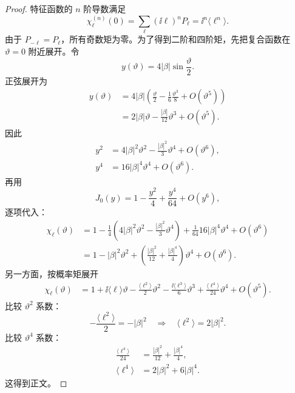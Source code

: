 \begin{proof}
特征函数的 $n$ 阶导数满足
\begin{equation*}
 \chi_\ell^{(n)}(0)
 =\sum_\ell(\ii\ell)^nP_\ell
 =\ii^n\langle\ell^n\rangle.
\end{equation*}
由于 $P_{-\ell}=P_\ell$，所有奇数矩为零。为了得到二阶和四阶矩，先把复合函数在 $\vartheta=0$ 附近展开。令
\begin{equation*}
 y(\vartheta)
 =4|\beta|\sin\frac{\vartheta}{2}.
\end{equation*}
正弦展开为
\begin{align*}
 y(\vartheta)
 &=4|\beta|
 \left(\frac\vartheta2-\frac1{6}\frac{\vartheta^3}{8}
 +O(\vartheta^5)\right)\\
 &=2|\beta|\vartheta
 -\frac{|\beta|}{12}\vartheta^3
 +O(\vartheta^5).
\end{align*}
因此
\begin{align*}
 y^2
 &=4|\beta|^2\vartheta^2
 -\frac{|\beta|^2}{3}\vartheta^4
 +O(\vartheta^6),\\
 y^4
 &=16|\beta|^4\vartheta^4
 +O(\vartheta^6).
\end{align*}
再用
\begin{equation*}
 J_0(y)
 =1-\frac{y^2}{4}+\frac{y^4}{64}+O(y^6),
\end{equation*}
逐项代入：
\begin{align*}
 \chi_\ell(\vartheta)
 &=1-\frac14
 \left(4|\beta|^2\vartheta^2
 -\frac{|\beta|^2}{3}\vartheta^4\right)
 +\frac1{64}
 16|\beta|^4\vartheta^4
 +O(\vartheta^6)\\
 &=1-|\beta|^2\vartheta^2
 +\left(
 \frac{|\beta|^2}{12}
 +\frac{|\beta|^4}{4}
 \right)\vartheta^4
 +O(\vartheta^6).
\end{align*}
另一方面，按概率矩展开
\begin{align*}
 \chi_\ell(\vartheta)
 &=1
 +\ii\langle\ell\rangle\vartheta
 -\frac{\langle\ell^2\rangle}{2}\vartheta^2
 -\frac{\ii\langle\ell^3\rangle}{6}\vartheta^3
 +\frac{\langle\ell^4\rangle}{24}\vartheta^4
 +O(\vartheta^5).
\end{align*}
比较 $\vartheta^2$ 系数：
\begin{equation*}
 -\frac{\langle\ell^2\rangle}{2}=-|\beta|^2
 \quad\Rightarrow\quad
 \langle\ell^2\rangle=2|\beta|^2.
\end{equation*}
比较 $\vartheta^4$ 系数：
\begin{align*}
 \frac{\langle\ell^4\rangle}{24}
 &=\frac{|\beta|^2}{12}+\frac{|\beta|^4}{4},\\
 \langle\ell^4\rangle
 &=2|\beta|^2+6|\beta|^4.
\end{align*}
这得到正文。


\end{proof}

